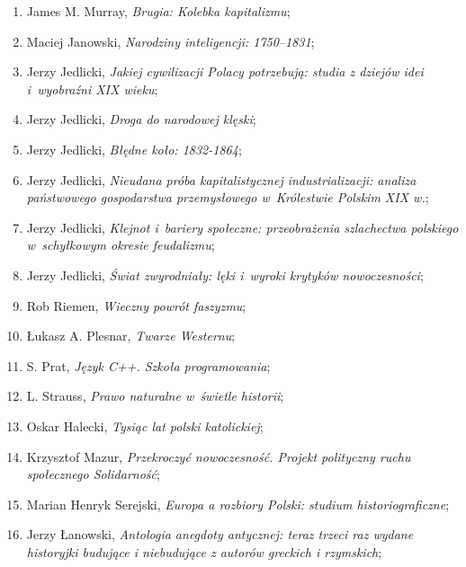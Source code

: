 \documentclass[a4paper,11pt]{article}
\begin{document}
\begin{enumerate}
\item James M. Murray, \emph{Brugia: Kolebka kapitalizmu};

\item Maciej Janowski, \emph{Narodziny inteligencji: 1750--1831};

\item Jerzy Jedlicki, \emph{Jakiej cywilizacji Polacy potrzebują:
    studia z dziejów idei i~wyobraźni XIX wieku};

\item Jerzy Jedlicki, \emph{Droga do narodowej klęski};

\item Jerzy Jedlicki, \emph{Błędne koło: 1832-1864};

\item Jerzy Jedlicki, \emph{Nieudana próba kapitalistycznej
    industrializacji: analiza państwowego gospodarstwa przemysłowego
    w~Królestwie Polskim XIX w.};

\item Jerzy Jedlicki, \emph{Klejnot i~bariery społeczne: przeobrażenia
    szlachectwa polskiego w~schyłkowym okresie feudalizmu};

\item Jerzy Jedlicki, \emph{Świat zwyrodniały: lęki i~wyroki krytyków
    nowoczesności};

\item Rob Riemen, \emph{Wieczny powrót faszyzmu};

\item Łukasz A. Plesnar, \emph{Twarze Westernu};

\item S. Prat, \emph{Język C++. Szkoła programowania};

\item L. Strauss, \emph{Prawo naturalne w~świetle historii};

\item Oskar Halecki, \emph{Tysiąc lat polski katolickiej};

\item Krzysztof Mazur, \emph{Przekroczyć nowoczesność. Projekt
    polityczny ruchu społecznego Solidarność};

\item Marian Henryk Serejski, \emph{Europa a rozbiory Polski: studium
    historiograficzne};

\item Jerzy Łanowski, \emph{Antologia anegdoty antycznej: teraz trzeci
    raz wydane historyjki budujące i niebudujące z autorów greckich i
    rzymskich};


\end{enumerate}
\end{document}
